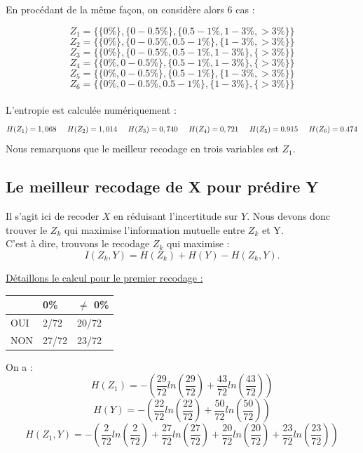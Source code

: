 \documentclass{article}
\begin{document}
En procédant de la même façon, on considère alors 6 cas :

\[
Z_1 =\{ \{0 \% \} , \{0 - 0.5 \%\} ,\{0.5-1 \% ,1-3 \% ,>3 \% \} \}  
\]
\[
  Z_2 =\{ \{0 \% \} , \{0 - 0.5\%, 0.5-1 \% \} ,\{1-3 \% ,>3 \% \} \}
\]
\[
  Z_3 =\{ \{0 \% \} , \{0 - 0.5\%, 0.5-1 \% ,1-3 \%  \} ,\{>3 \% \} \}
\]
\[
  Z_4 =\{ \{0 \%, 0 - 0.5\%\} , \{ 0.5-1 \% ,1-3 \%  \} ,\{>3 \% \} \}
\]
\[
  Z_5 =\{ \{0 \%, 0 - 0.5\%\} , \{ 0.5-1 \% \} ,\{1-3 \% , >3 \% \} \}
\]
\[
  Z_6 =\{ \{0 \%, 0 - 0.5\%,  0.5-1 \% \} , \{1-3 \%  \} ,\{>3 \% \} \}
\]
\\
L'entropie est calculée numériquement :
\[
H(Z_1) = 1,068 \hspace{0.5cm} H(Z_2) = 1,014 \hspace{0.5cm} H(Z_3) = 0,740 \hspace{0.5cm} H(Z_4) = 0,721 \hspace{0,5cm} H(Z_5) = 0.915 \hspace{0,5 cm} H(Z_6) = 0.474
\]
Nous remarquons que le meilleur recodage en trois variables est $Z_1$.

\subsection{Le meilleur recodage de X pour prédire Y }

Il s'agit ici de recoder $X$ en réduisant l'incertitude sur $Y$.
Nous devons donc trouver le $Z_k$ qui maximise l'information mutuelle entre $Z_k$ et Y.
\\
C'est à dire, trouvons le recodage $Z_k$ qui maximise :
\[
I(Z_k,Y) = H(Z_k) + H(Y) - H(Z_k,Y).
\]

\underline{Détaillons le calcul pour le premier recodage :}

\begin{table}[H]
  \centering
  \begin{tabular}{|l|l|l|}
  \hline
      & 0\%   & $\neq$ 0\% \\ \hline
  OUI & 2/72  & 20/72 \\ \hline
  NON & 27/72 & 23/72 \\ \hline
  \end{tabular}
  \end{table}


  On a :
\[
H(Z_1)= -\left(\frac{29}{72}ln(\frac{29}{72})+\frac{43}{72}ln(\frac{43}{72})\right)
\]
\[
H(Y)=-\left(\frac{22}{72}ln(\frac{22}{72})+\frac{50}{72}ln(\frac{50}{72})\right)
\]
\[
H(Z_1,Y)=-\left(\frac{2}{72}ln(\frac{2}{72})+\frac{27}{72}ln(\frac{27}{72})+\frac{20}{72}ln(\frac{20}{72})+\frac{23}{72}ln(\frac{23}{72})\right)
\]
\end{document}
